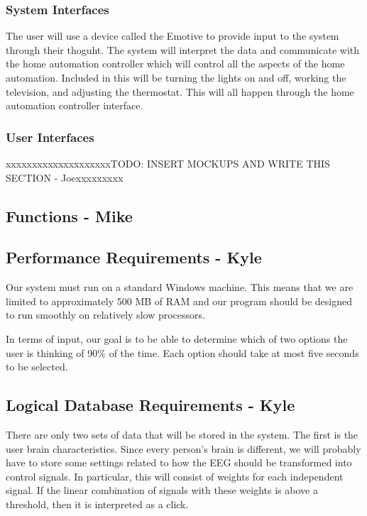 \documentclass{article}
\begin{document}
\subsubsection{System Interfaces}

The user will use a device called the Emotive to provide input to the system through their thoguht. The system will interpret the data and communicate with the home automation controller which will control all the aspects of the home automation. Included in this will be turning the lights on and off, working the television, and adjusting the thermostat. This will all happen through the home automation controller interface.

\subsubsection{User Interfaces}
{\color{red}xxxxxxxxxxxxxxxxxxxxTODO: INSERT MOCKUPS AND WRITE THIS SECTION - Joexxxxxxxxx}

\subsection{Functions - Mike}

\subsection{Performance Requirements - Kyle}
Our system must run on a standard Windows machine. This means that we are limited to approximately 500 MB of RAM and our program should be designed to run smoothly on relatively slow processors.

In terms of input, our goal is to be able to determine which of two options the user is thinking of 90\% of the time. Each option should take at most five seconds to be selected.

\subsection{Logical Database Requirements - Kyle}
There are only two sets of data that will be stored in the system. The first is the user brain characteristics. Since every person's brain is different, we will probably have to store some settings related to how the EEG should be transformed into control signals. In particular, this will consist of weights for each independent signal. If the linear combination of signals with these weights is above a threshold, then it is interpreted as a click.
\end{document}
